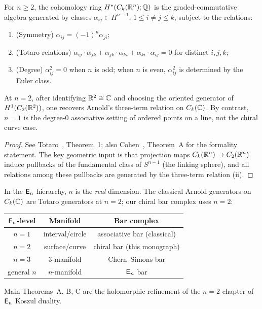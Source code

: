 \begin{theorem}
\label{thm:totaro-presentation}
For $n \geq 2$, the cohomology ring
$H^*(C_k(\mathbb{R}^n); \mathbb{Q})$ is the graded-commutative algebra
generated by classes $\alpha_{ij} \in H^{n-1}$,
$1 \leq i \neq j \leq k$, subject to the relations:
\begin{enumerate}[label=\textup{(\roman*)}]
\item \textup{(Symmetry)}\quad
  $\alpha_{ij} = (-1)^n \alpha_{ji}$;
\item \textup{(Totaro relations)}\quad
  $\alpha_{ij} \cdot \alpha_{jk}
  + \alpha_{jk} \cdot \alpha_{ki}
  + \alpha_{ki} \cdot \alpha_{ij} = 0$
  for distinct $i, j, k$;
\item \textup{(Degree)}\quad
  $\alpha_{ij}^2 = 0$ when $n$ is odd;
  when $n$ is even, $\alpha_{ij}^2$ is determined by the Euler class.
\end{enumerate}
At $n = 2$, after identifying $\mathbb{R}^2 \cong \mathbb{C}$ and choosing the
oriented generator of $H^1(C_2(\mathbb{R}^2))$, one recovers Arnold's
three-term relation on $C_k(\mathbb{C})$.  By contrast, $n = 1$ is the
degree-$0$ associative setting of ordered points on a line, not the
chiral curve case.
\end{theorem}

\begin{proof}
See Totaro~\cite{Totaro96}, Theorem~1; also
Cohen~\cite{Coh76}, Theorem~A for the formality statement.
The key geometric input is that projection maps
$C_k(\mathbb{R}^n) \to C_2(\mathbb{R}^n)$ induce pullbacks of the
fundamental class of $S^{n-1}$ (the linking sphere), and all
relations among these pullbacks are generated by the three-term
relation (ii).
\end{proof}

\begin{remark}[Arnold as Totaro at \texorpdfstring{$n = 2$}{n = 2}]
\label{rem:arnold-totaro}
In the $\mathsf{E}_n$ hierarchy, $n$ is the \emph{real} dimension.
The classical Arnold generators on $C_k(\mathbb{C})$ are Totaro
generators at $n = 2$; our chiral bar complex uses $n = 2$:
\begin{center}
\begin{tabular}{ccc}
$\mathsf{E}_n$-level & Manifold & Bar complex \\
\hline
$n = 1$ & interval/circle & associative bar (classical) \\
$n = 2$ & surface/curve & chiral bar (this monograph) \\
$n = 3$ & $3$-manifold & Chern--Simons bar \\
general $n$ & $n$-manifold & $\mathsf{E}_n$ bar
\end{tabular}
\end{center}
Main Theorems~A, B, C are the holomorphic refinement of the
$n = 2$ chapter of $\mathsf{E}_n$ Koszul duality.
\end{remark}


